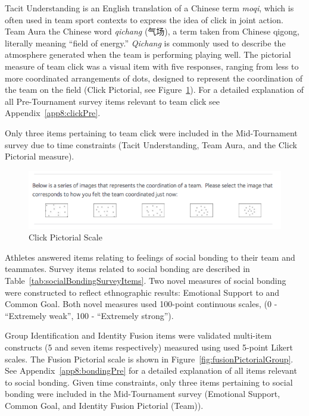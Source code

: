 \begin{CJK}{UTF8}{gbsn}
Tacit Understanding is an English translation of a Chinese term \textit{moqi}, which is often used in team sport contexts to express the idea of click in joint action.  Team Aura the Chinese word \textit{qichang} (气场), a term taken from Chinese qigong, literally meaning ``field of energy.'' \textit{Qichang} is commonly used to describe the atmosphere generated when the team is performing playing well.  The pictorial measure of team click was a visual item with five responses, ranging from less to more coordinated arrangements of dots, designed to represent the coordination of the team on the field (Click Pictorial, see Figure~\ref{fig:clickPictorial}).  For a detailed explanation of all Pre-Tournament survey items relevant to team click see Appendix~\ref{app8:clickPre}.

Only three items pertaining to team click were included in the Mid-Tournament survey due to time constraints (Tacit Understanding, Team Aura, and the Click Pictorial measure).




  \begin{figure}[htbp]
    \includegraphics[width = \linewidth]{images/teamClickPictorial.png}
    \caption{Click Pictorial Scale}
    \label{fig:clickPictorial}
  \end{figure}


Athletes answered items relating to feelings of social bonding to their team and teammates.  Survey items related to social bonding are described in Table~\ref{tab:socialBondingSurveyItems}. Two novel measures of social bonding were constructed to reflect ethnographic results: Emotional Support to and Common Goal.  Both novel measures used 100-point continuous scales, (0 - ``Extremely weak'', 100 - ``Extremely strong'').

Group Identification and Identity Fusion items were validated multi-item constructs (5 and seven items respectively) measured using used 5-point Likert scales. The Fusion Pictorial scale is shown in Figure~\ref{fig:fusionPictorialGroup}.  See Appendix~\ref{app8:bondingPre} for a detailed explanation of all items relevant to social bonding.  Given time constraints, only three items pertaining to social bonding were included in the Mid-Tournament survey (Emotional Support, Common Goal, and Identity Fusion Pictorial (Team)).


\end{CJK}
